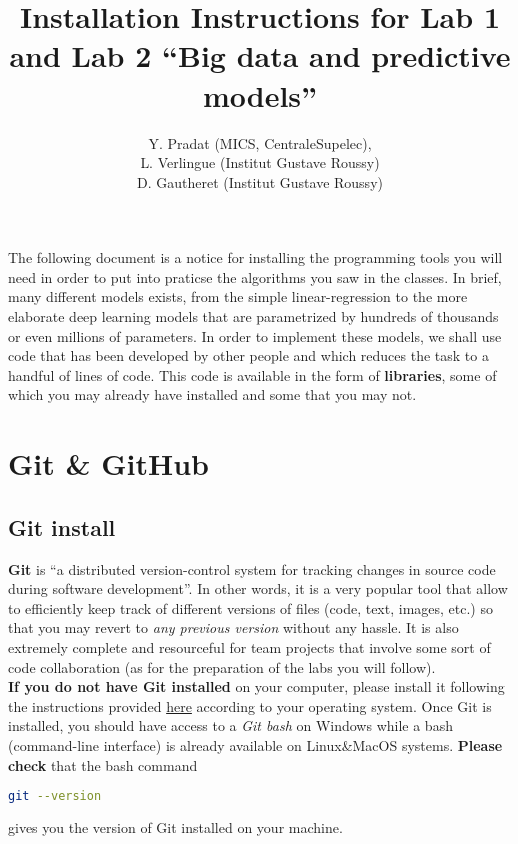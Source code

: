 \documentclass[a4paper, 11pt]{article}
\begin{document}
\title{Installation Instructions for Lab 1 and Lab 2 “Big data and predictive models”}
\author{Y. Pradat (MICS, CentraleSupelec),\\L. Verlingue (Institut Gustave Roussy)\\D. Gautheret (Institut Gustave 
Roussy)}
\date{}
\maketitle

The following document is a notice for installing the programming tools you will need in order to put into praticse the 
algorithms you saw in the classes. In brief, many different models exists, from the simple linear-regression to the more 
elaborate deep learning models that are parametrized by hundreds of thousands or even millions of parameters.
In order to implement these models, we shall use code that has been developed by other people and which reduces the task 
to a handful of lines of code.  This code is available in the form of \textbf{libraries}, some of which you may already 
have installed and some that you may not.

\section{Git \& GitHub}

\subsection{Git install}

\textbf{Git} is “a distributed version-control system for tracking changes in source code during software development”.  
In other words, it is a very popular tool that allow to efficiently keep track of different versions of files (code, 
text, images, etc.) so that you may revert to \textit{any previous version} without any hassle. It is also extremely 
complete and resourceful for team projects that involve some sort of code collaboration (as for the preparation of the 
labs you will follow). \\ 

\textbf{If you do not have Git installed} on your computer, please install it following the instructions provided 
\href{https://git-scm.com/book/en/v2/Getting-Started-Installing-Git}{here} according to your operating system. Once Git 
is installed, you should have access to a \textit{Git bash} on Windows while a bash (command-line interface) is already 
available on Linux\&MacOS systems.  \textbf{Please check} that the bash command
\begin{lstlisting}[language=bash]
git --version
\end{lstlisting}
gives you the version of Git installed on your machine.
\end{document}
